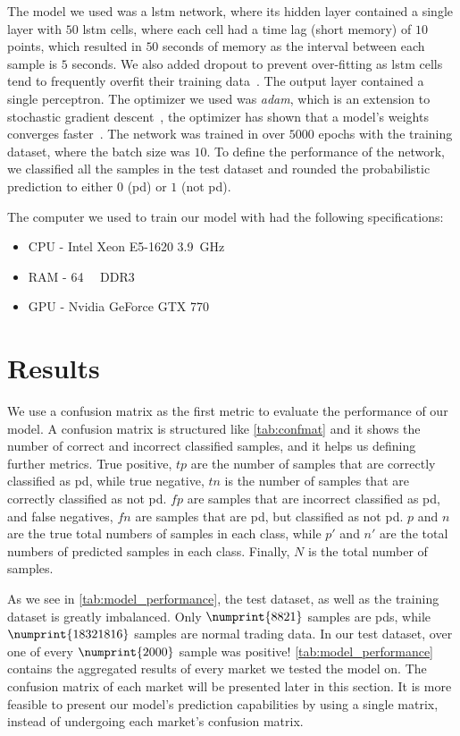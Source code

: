 The model we used was a \ac{lstm} network, where its hidden layer contained a single layer with $50$ \ac{lstm} cells, where each cell had a time lag (short memory) of $10$ points, which resulted in $50$ seconds of memory as the interval between each sample is $5$ seconds. We also added dropout to prevent over-fitting as \ac{lstm} cells tend to frequently overfit their training data~\cite{overfit}. The output layer contained a single perceptron. The optimizer we used was \emph{adam}, which is an extension to stochastic gradient descent~\cite{kingma2014adam}, the optimizer has shown that a model's weights converges faster~\cite{adam}. The network was trained in over $5000$ epochs with the training dataset, where the batch size was $10$. To define the performance of the network, we classified all the samples in the test dataset and rounded the probabilistic prediction to either $0$ (\ac{pd}) or $1$ (not \ac{pd}). 

The computer we used to train our model with had the following specifications:
\begin{itemize}
    \item CPU - Intel Xeon E5-1620 \SI{3.9}{\giga\hertz}
    \item RAM - \SI{64}{\gibi\byte} DDR3 
    \item GPU - Nvidia GeForce GTX 770
\end{itemize}

\section{Results}
We use a confusion matrix as the first metric to evaluate the performance of our model. A confusion matrix is structured like \autoref{tab:confmat} and it shows the number of correct and incorrect classified samples, and it helps us defining further metrics. True positive, $tp$ are the number of samples that are correctly classified as \ac{pd}, while true negative, $tn$ is the number of  samples that are correctly classified as not \ac{pd}. $fp$ are samples that are incorrect classified as \ac{pd}, and false negatives, $fn$ are samples that are \ac{pd}, but classified as not \ac{pd}. $p$ and $n$ are the true total numbers of samples in each class, while $p'$ and $n'$ are the total numbers of predicted samples in each class. Finally, $N$ is the total number of samples.




As we see in \autoref{tab:model_performance}, the test dataset, as well as the training dataset is greatly imbalanced. Only $\numprint{8821}$ samples are \acp{pd}, while $\numprint{18321816}$ samples are normal trading data. In our test dataset, over one of every $\numprint{2000}$ sample was positive! \autoref{tab:model_performance} contains the aggregated results of every market we tested the model on. The confusion matrix of each market will be presented later in this section. It is more feasible to present our model's prediction capabilities by using a single matrix, instead of undergoing each market's confusion matrix.

